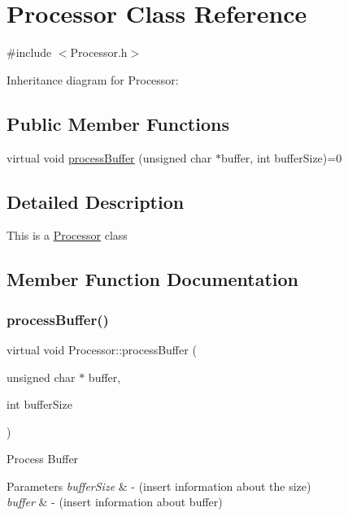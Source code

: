 \hypertarget{classProcessor}{}\section{Processor Class Reference}
\label{classProcessor}


{\ttfamily \#include $<$Processor.\+h$>$}



Inheritance diagram for Processor\+:
\subsection*{Public Member Functions}
\begin{DoxyCompactItemize}
\item 
virtual void \hyperlink{classProcessor_a401e57b59e43de9c4a51ca0f566d2948}{process\+Buffer} (unsigned char $\ast$buffer, int buffer\+Size)=0
\end{DoxyCompactItemize}


\subsection{Detailed Description}
This is a \hyperlink{classProcessor}{Processor} class 

\subsection{Member Function Documentation}
\mbox{\label{classProcessor_a401e57b59e43de9c4a51ca0f566d2948}} 
\subsubsection{\texorpdfstring{process\+Buffer()}{processBuffer()}}
{\footnotesize\ttfamily virtual void Processor\+::process\+Buffer (\begin{DoxyParamCaption}\item[{unsigned char $\ast$}]{buffer,  }\item[{int}]{buffer\+Size }\end{DoxyParamCaption})\hspace{0.3cm}{\ttfamily [pure virtual]}}

Process Buffer 
\begin{DoxyParams}{Parameters}
{\em buffer\+Size} & -\/ (insert information about the size) \\
\hline
{\em buffer} & -\/ (insert information about buffer) \\
\hline
\end{DoxyParams}


